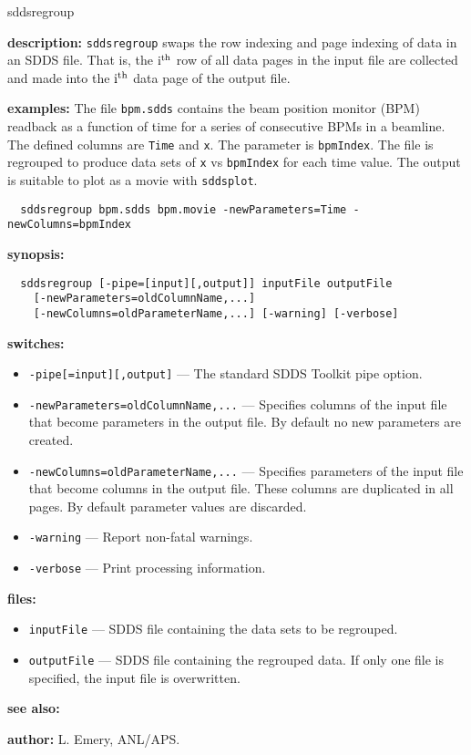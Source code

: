 \begin{sddsprog}{sddsregroup}
  \item \textbf{description:}
  \verb|sddsregroup| swaps the row indexing and page indexing of data
  in an SDDS file. That is, the ${\rm i^{th}}$ row of all data pages in the input file are collected
  and made into the ${\rm i^{th}}$ data page of the output file.

  \item \textbf{examples:}
  The file \verb|bpm.sdds| contains the beam position monitor (BPM) readback as a function of time for a series
  of consecutive BPMs in a beamline. The defined columns are \verb|Time| and \verb|x|. The parameter
  is \verb|bpmIndex|. The file is regrouped to produce data sets of \verb|x| vs \verb|bpmIndex|
  for each time value. The output is suitable to plot as a movie with \verb|sddsplot|.
  \begin{verbatim}
  sddsregroup bpm.sdds bpm.movie -newParameters=Time -newColumns=bpmIndex
  \end{verbatim}

  \item \textbf{synopsis:}
  \begin{verbatim}
  sddsregroup [-pipe=[input][,output]] inputFile outputFile
    [-newParameters=oldColumnName,...]
    [-newColumns=oldParameterName,...] [-warning] [-verbose]
  \end{verbatim}

  \item \textbf{switches:}
  \begin{itemize}
    \item \verb|-pipe[=input][,output]| --- The standard SDDS Toolkit pipe option.
    \item \verb|-newParameters=oldColumnName,...| --- Specifies columns of the input file that become parameters in the output file. By default no new parameters are created.
    \item \verb|-newColumns=oldParameterName,...| --- Specifies parameters of the input file that become columns in the output file. These columns are duplicated in all pages. By default parameter values are discarded.
    \item \verb|-warning| --- Report non-fatal warnings.
    \item \verb|-verbose| --- Print processing information.
  \end{itemize}

  \item \textbf{files:}
  \begin{itemize}
    \item \verb|inputFile| --- SDDS file containing the data sets to be regrouped.
    \item \verb|outputFile| --- SDDS file containing the regrouped data. If only one file is specified, the input file is overwritten.
  \end{itemize}

  \item \textbf{see also:} 

  \item \textbf{author:} L. Emery, ANL/APS.
\end{sddsprog}

